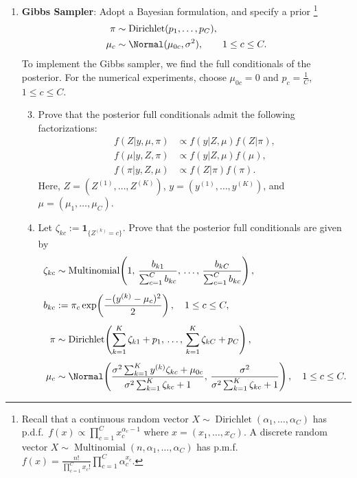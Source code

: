 \begin{enumerate}
\begin{enumerate}
    \item \textbf{Gibbs Sampler}: Adopt a Bayesian formulation, and specify a prior%
      \footnote{Recall that a continuous random vector $X \sim \operatorname{Dirichlet}(\alpha_1,
      \ldots, \alpha_C)$ has p.d.f.\ $f(x) \propto \prod_{c=1}^C x_c^{\alpha_c - 1}$ where
      $x = (x_1, \ldots, x_C)$. A discrete random vector $X \sim \operatorname{Multinomial}(n,
      \alpha_1, \ldots, \alpha_C)$ has p.m.f.\ $f(x) = \frac{n!}{\prod_{c=1}^C x_c!}
      \prod_{c=1}^C \alpha_c^{x_c}$.}
      \begin{align*}
        \pi &\sim \operatorname{Dirichlet}(p_1, \ldots, p_C),\\
        \mu_c &\sim \Normal(\mu_{0c}, \sigma^2), \qquad 1 \le c \le C.
      \end{align*}
      To implement the Gibbs sampler, we find the full conditionals of the posterior. For the
      numerical experiments, choose $\mu_{0c} = 0$ and $p_c = \frac{1}{C}$, $1 \le c \le C$.

      \begin{enumerate}[label=\alph*)]
        \setcounter{enumii}{2}
        \item Prove that the posterior full conditionals admit the following factorizations:
          \begin{align*}
            f(Z | y, \mu, \pi) &\propto f(y | Z, \mu) f(Z | \pi),\\
            f(\mu | y, Z, \pi) &\propto f(y | Z, \mu) f(\mu),\\
            f(\pi | y, Z, \mu) &\propto f(Z | \pi) f(\pi).
          \end{align*}
          Here, $Z = (Z^{(1)}, \ldots, Z^{(K)})$, $y = (y^{(1)}, \ldots, y^{(K)})$, and
          $\mu = (\mu_1, \ldots, \mu_C)$.

        \item Let $\zeta_{kc} := \mathbf{1}_{\{Z^{(k)} = c\}}$. Prove that the posterior full
          conditionals are given by
          \begin{align*}
            \zeta_{kc} &\sim \operatorname{Multinomial}\!\left(1,\,
              \frac{b_{k1}}{\sum_{c=1}^C b_{kc}},\, \ldots,\,
              \frac{b_{kC}}{\sum_{c=1}^C b_{kc}}\right),\\[4pt]
            b_{kc} &:= \pi_c \exp\!\left(\frac{-(y^{(k)} - \mu_c)^2}{2}\right),
              \quad 1 \le c \le C,\\[4pt]
            \pi &\sim \operatorname{Dirichlet}\!\left(
              \sum_{k=1}^K \zeta_{k1} + p_1,\, \ldots,\,
              \sum_{k=1}^K \zeta_{kC} + p_C\right),\\[4pt]
            \mu_c &\sim \Normal\!\left(
              \frac{\sigma^2 \sum_{k=1}^K y^{(k)} \zeta_{kc} + \mu_{0c}}%
                   {\sigma^2 \sum_{k=1}^K \zeta_{kc} + 1},\,
              \frac{\sigma^2}{\sigma^2 \sum_{k=1}^K \zeta_{kc} + 1}
            \right),\quad 1 \le c \le C.
          \end{align*}


\end{enumerate}
\end{enumerate}
\end{enumerate}
